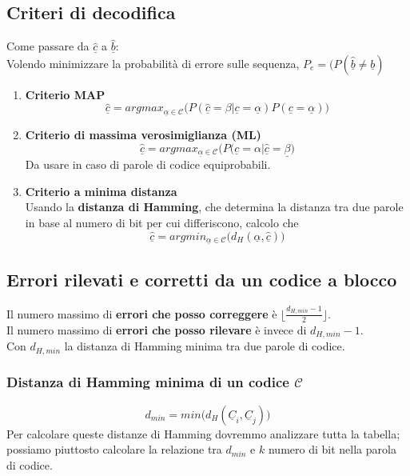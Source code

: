\documentclass{article}
\begin{document}
\subsection{Criteri di decodifica}
Come passare da $\underline{\hat{c}}$ a $\underline{\hat{b}}$:\\
Volendo minimizzare la probabilità di errore sulle sequenza, $P_e=(P(\underline{\hat{b}}\neq\underline{b})$
\begin{enumerate}
	\item \textbf{Criterio MAP}\\
	$$\underline{\hat{c}}=argmax_{\underline{\alpha}\in\mathcal{C}}\big(P(\underline{\hat{c}}=\beta|\underline{c}=\underline{\alpha})P(\underline{c}=\underline{\alpha})\big)$$
	\item \textbf{Criterio di massima verosimiglianza (ML)}
	$$\underline{\hat{c}}=argmax_{\underline{\alpha}\in\mathcal{C}}\big(P(\underline{c}=\alpha|\underline{\hat{c}}=\underline{\beta}\big)$$
	Da usare in caso di parole di codice equiprobabili.
	\item \textbf{Criterio a minima distanza}\\
	Usando la \textbf{distanza di Hamming}, che determina la distanza tra due parole in base al numero di bit per cui differiscono, calcolo che
	$$\underline{\hat{c}}=argmin_{\underline{\alpha}\in\mathcal{C}}\big(d_H(\underline{\alpha},\underline{\hat{c}})\big)$$
\end{enumerate}

\subsection{Errori rilevati e corretti da un codice a blocco}
Il numero massimo di \textbf{errori che posso correggere} è $\lfloor\frac{d_{H,min}-1}{2}\rfloor$.\\
Il numero massimo di \textbf{errori che posso rilevare} è invece di $d_{H,min}-1$.\\
Con $d_{H,min}$ la distanza di Hamming minima tra due parole di codice.

\subsubsection{Distanza di Hamming minima di un codice $\mathcal{C}$}
$$d_{min}=min\big(d_H(\underline{C}_i,\underline{C}_j)\big)$$
Per calcolare queste distanze di Hamming dovremmo analizzare tutta la tabella; possiamo piuttosto calcolare la relazione tra $d_{min}$ e $k$ numero di bit nella parola di codice.
\end{document}
